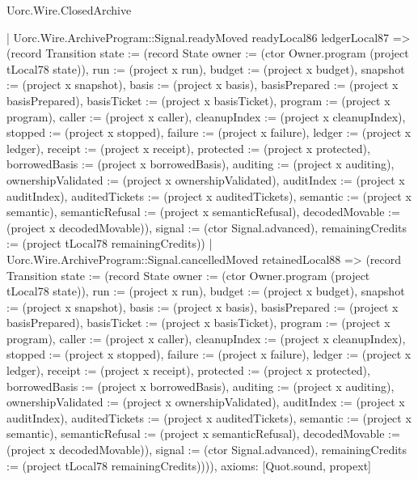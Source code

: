 \begin{lexlean}{Uorc.Wire.ClosedArchive}
\begin{semanticmodule}
{    | Uorc.Wire.ArchiveProgram::Signal.readyMoved readyLocal86 ledgerLocal87 => (record Transition {state := (record State {owner := (ctor Owner.program (project tLocal78 state)), run := (project x run), budget := (project x budget), snapshot := (project x snapshot), basis := (project x basis), basisPrepared := (project x basisPrepared), basisTicket := (project x basisTicket), program := (project x program), caller := (project x caller), cleanupIndex := (project x cleanupIndex), stopped := (project x stopped), failure := (project x failure), ledger := (project x ledger), receipt := (project x receipt), protected := (project x protected), borrowedBasis := (project x borrowedBasis), auditing := (project x auditing), ownershipValidated := (project x ownershipValidated), auditIndex := (project x auditIndex), auditedTickets := (project x auditedTickets), semantic := (project x semantic), semanticRefusal := (project x semanticRefusal), decodedMovable := (project x decodedMovable)}), signal := (ctor Signal.advanced), remainingCredits := (project tLocal78 remainingCredits)})
    | Uorc.Wire.ArchiveProgram::Signal.cancelledMoved retainedLocal88 => (record Transition {state := (record State {owner := (ctor Owner.program (project tLocal78 state)), run := (project x run), budget := (project x budget), snapshot := (project x snapshot), basis := (project x basis), basisPrepared := (project x basisPrepared), basisTicket := (project x basisTicket), program := (project x program), caller := (project x caller), cleanupIndex := (project x cleanupIndex), stopped := (project x stopped), failure := (project x failure), ledger := (project x ledger), receipt := (project x receipt), protected := (project x protected), borrowedBasis := (project x borrowedBasis), auditing := (project x auditing), ownershipValidated := (project x ownershipValidated), auditIndex := (project x auditIndex), auditedTickets := (project x auditedTickets), semantic := (project x semantic), semanticRefusal := (project x semanticRefusal), decodedMovable := (project x decodedMovable)}), signal := (ctor Signal.advanced), remainingCredits := (project tLocal78 remainingCredits)}))),
  axioms: [Quot.sound, propext]
}


\end{semanticmodule}
\end{lexlean}
